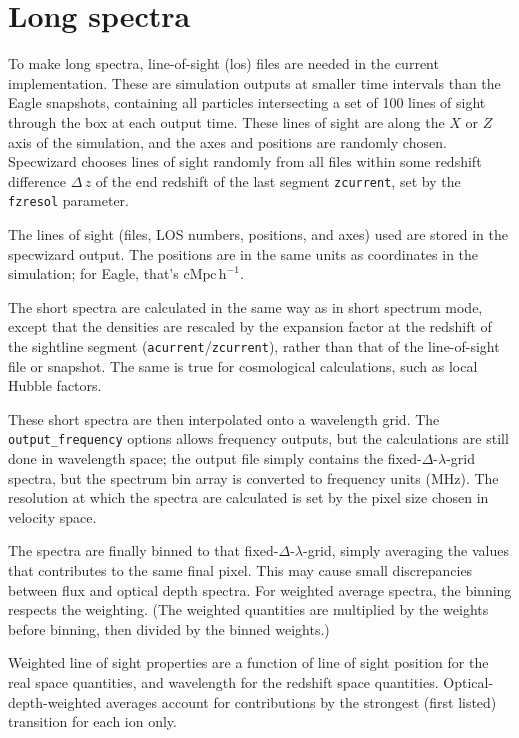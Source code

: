 \documentclass{report}
\newcommand{\param}[1]{{\tt #1}}
\begin{document}
\section{Long spectra}
To make long spectra, line-of-sight (los) files are needed in the current implementation. These are simulation outputs at smaller time intervals than the Eagle snapshots, containing all particles intersecting a set of 100 lines of sight through the box at each output time. These lines of sight are along the $X$ or $Z$ axis of the simulation, and the axes and positions are randomly chosen. Specwizard chooses lines of sight randomly from all files within some redshift difference $\Delta \, z$ of the end redshift of the last segment \param{zcurrent}, set by the \param{fzresol} parameter.

The lines of sight (files, LOS numbers, positions, and axes) used are stored in the specwizard output. The positions are in the same units as coordinates in the simulation; for Eagle, that's $\mathrm{cMpc} \, \mathrm{h}^{-1}$.

The short spectra are calculated in the same way as in short spectrum mode, except that the densities are rescaled by the expansion factor at the redshift of the sightline segment (\param{acurrent}/\param{zcurrent}), rather than that of the line-of-sight file or snapshot. The same is true for cosmological calculations, such as local Hubble factors.

These short spectra are then interpolated onto a wavelength grid. The \param{output\_frequency} options allows frequency outputs, but the calculations are still done in wavelength space; the output file simply contains the fixed-$\Delta$-$\lambda$-grid spectra, but the spectrum bin array is converted to frequency units (MHz). The resolution at which the spectra are calculated is set by the pixel size chosen in velocity space.

The spectra are finally binned to that fixed-$\Delta$-$\lambda$-grid, simply averaging the values that contributes to the same final pixel. This may cause small discrepancies between flux and optical depth spectra. For weighted average spectra, the binning respects the weighting. (The weighted quantities are multiplied by the weights before binning, then divided by the binned weights.)

Weighted line of sight properties are a function of line of sight position for the real space quantities, and wavelength for the redshift space quantities. Optical-depth-weighted averages account for contributions by the strongest (first listed) transition for each ion only.
\end{document}
